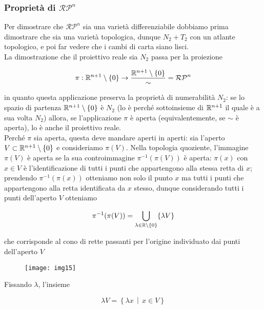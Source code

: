 \subsubsection{Proprietà di $ \mathcal{RP}^{n} $}

Per dimostrare che $ \mathcal{RP}^{n} $ sia una varietà differenziabile dobbiamo prima dimostrare che sia una varietà topologica, dunque $ N_{2}+T_{2} $ con un atlante topologico, e poi far vedere che i cambi di carta siano lisci.\\
La dimostrazione che il proiettivo reale sia $ N_{2} $ passa per la proiezione

\begin{equation}
	\pi : \mathbb{R}^{n+1} \setminus \{0\} \to \dfrac{\mathbb{R}^{n+1} \setminus \{0\}}{\sim} = \mathcal{RP}^{n}
\end{equation}

in quanto questa applicazione preserva la proprietà di numerabilità $ N_{2} $: se lo spazio di partenza $ \mathbb{R}^{n+1} \setminus \{0\} $ è $ N_{2} $ (lo è perché sottoinsieme di $ \mathbb{R}^{n+1} $ il quale è a sua volta $ N_{2} $) allora, se l'applicazione $ \pi $ è aperta (equivalentemente, se $ \sim $ è aperta), lo è anche il proiettivo reale.\\
Perché $ \pi $ sia aperta, questa deve mandare aperti in aperti: sia l'aperto $ V \subset \mathbb{R}^{n+1} \setminus \{0\} $ e consideriamo $ \pi(V) $. Nella topologia quoziente, l'immagine $ \pi(V) $ è aperta se la sua controimmagine $ \pi^{-1}(\pi(V)) $ è aperta: $ \pi(x) $ con $ x \in V $ è l'identificazione di tutti i punti che appartengono alla stessa retta di $ x $; prendendo $ \pi^{-1}(\pi(x)) $ otteniamo non solo il punto $ x $ ma tutti i punti che appartengono alla retta identificata da $ x $ stesso, dunque considerando tutti i punti dell'aperto $ V $ otteniamo

\begin{equation}
	\pi^{-1}(\pi(V)) = \bigcup_{\lambda \in \mathbb{R} \setminus \{0\}} \{\lambda V\}
\end{equation}

che corrisponde al cono di rette passanti per l'origine individuato dai punti dell'aperto $ V $

\begin{figure}[H]
	\centering
	\texttt{[image: img15]}
\end{figure}

Fissando $ \lambda $, l'insieme

\begin{equation}
	\lambda V = \left\{ \lambda x \, \middle| \, x \in V \right\}
\end{equation}


